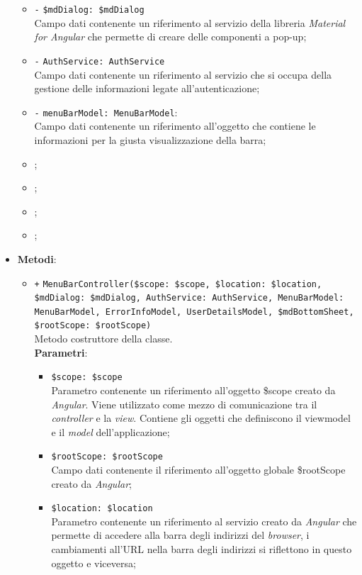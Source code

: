 \begin{itemize}
\begin{itemize}
		\item \texttt{-} \texttt{\$mdDialog: \$mdDialog} \\
		Campo dati contenente un riferimento al servizio della libreria \textit{Material for Angular} che permette di creare delle componenti a pop-up;
		\item \texttt{-} \texttt{AuthService: AuthService} \\
		Campo dati contenente un riferimento al servizio che si occupa della gestione delle informazioni legate all'autenticazione;
		\item \texttt{-} \texttt{menuBarModel: MenuBarModel}: \\
		Campo dati contenente un riferimento all'oggetto che contiene le informazioni per la giusta visualizzazione della barra;
		\item \rootscopeA;
		\item \errorinfomodelA;
		\item \userdetailsmodelA;
		\item \mdBottomSheetA;
	\end{itemize}
	\item \textbf{Metodi}:
	\begin{itemize}
		\item \texttt{+} \texttt{MenuBarController(\$scope: \$scope, \$location: \$location, \\ \$mdDialog:  \$mdDialog, AuthService: AuthService, MenuBarModel: MenuBarModel, ErrorInfoModel, UserDetailsModel, \$mdBottomSheet, \$rootScope: \$rootScope)} \\
		Metodo costruttore della classe. \\
		\textbf{Parametri}:
		\begin{itemize}
			\item \texttt{\$scope: \$scope} \\
			Parametro contenente un riferimento all’oggetto \$scope creato da \textit{Angular}. Viene utilizzato come mezzo di comunicazione tra il \textit{controller} e la \textit{view}. Contiene gli oggetti che definiscono il viewmodel e il \textit{model} dell'applicazione;
			\item \texttt{\$rootScope: \$rootScope} \\
			Campo dati contenente il riferimento all'oggetto globale \$rootScope creato da \textit{Angular};
			\item \texttt{\$location: \$location} \\
			Parametro contenente un riferimento al servizio creato da \textit{Angular} che permette di accedere alla barra degli indirizzi del \textit{browser}, i cambiamenti all’URL nella barra degli indirizzi si riflettono in questo oggetto e viceversa;

\end{itemize}
\end{itemize}
\end{itemize}
